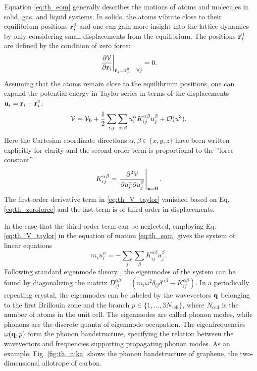 Equation \eqref{eq:th_eom} generally describes the motions of atoms and molecules in solid, gas, and liquid systems. In solids, the atoms vibrate close to their equilibrium positions $\mathbf{r}_i^0$ and one can gain more insight into the lattice dynamics by only considering small displacements from the equilibrium. The positions $\mathbf{r}_i^0$ are defined by the condition of zero force:
\begin{equation}
 \left. \frac{\partial \mathcal{V}}{\partial \mathbf{r}_i} \right|_{\mathbf{r}_j=\mathbf{r}_j^0 \quad \forall j} = 0. \label{eq:th_zeroforce}
\end{equation}
Assuming that the atoms remain close to the equilibrium positions, one can expand the potential energy in Taylor series in terms of the displacements $\mathbf{u}_i=\mathbf{r}_i-\mathbf{r}_i^0$:
\begin{equation}
 \mathcal{V} = \mathcal{V}_0 + \frac{1}{2} \sum_{i,j} \sum_{\alpha,\beta} u_i^{\alpha} K_{ij}^{\alpha \beta} u_j^{\beta}  + \mathcal{O}(u^3). \label{eq:th_V_taylor}
\end{equation}
Here the Cartesian coordinate directions $\alpha,\beta \in \{x,y,z\}$ have been written explicitly for clarity and the second-order term is proportional to the ''force constant''
\begin{equation}
 K_{ij}^{\alpha\beta} = \left. \frac{\partial^2 \mathcal{V}}{\partial u_i^{\alpha} \partial u_j^{\beta}} \right|_{\mathbf{u}=\mathbf{0}}. \label{eq:th_K_def}
\end{equation}
The first-order derivative term in \eqref{eq:th_V_taylor} vanished based on Eq. \eqref{eq:th_zeroforce} and the last term is of third order in displacements.

In the case that the third-order term can be neglected, employing Eq. \eqref{eq:th_V_taylor} in the equation of motion \eqref{eq:th_eom} gives the system of linear equations
\begin{equation}
 m_i \ddot{u}_i^{\alpha} = - \sum_j \sum_{\beta} K_{ij}^{\alpha\beta} u_j^{\beta}.
\end{equation}
Following standard eigenmode theory \cite{fetter}, the eigenmodes of the system can be found by diagonalizing the matrix $D_{ij}^{\alpha\beta} = (m_i\omega^2 \delta_{ij}\delta
^{\alpha\beta}-K_{ij}^{\alpha\beta})$. In a periodically repeating crystal, the eigenmodes can be labeled by the wavevectors $\mathbf{q}$ belonging to the first Brillouin zone \cite{ziman} and the branch $p \in \{1,\dots,3N_{\textrm{cell}}\}$, where $N_{\textrm{cell}}$ is the number of atoms in the unit cell. The eigenmodes are called phonon modes, while phonons are the discrete quanta of eigenmode occupation. The eigenfrequencies $\omega(\mathbf{q},p)$ form the phonon bandstructure, specifying the relation between the wavevectors and frequencies supporting propagating phonon modes. As an example, Fig. \ref{fig:th_nika} shows the phonon bandstructure of graphene, the two-dimensional allotrope of carbon. 

